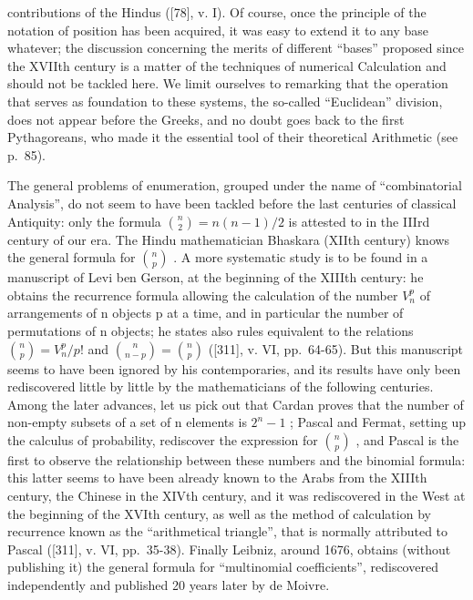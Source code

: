 contributions of the Hindus ({[}78{]}, v. I). Of course, once the principle of the notation of position has been acquired, it was easy to extend it to any base whatever; the discussion concerning the merits of different ``bases'' proposed since the XVIIth century is a matter of the techniques of numerical Calculation and should not be tackled here. We limit ourselves to remarking that the operation that serves as foundation to these systems, the so-called ``Euclidean'' division, does not appear before the Greeks, and no doubt goes back to the first Pythagoreans, who made it the essential tool of their theoretical Arithmetic (see p.~85).

The general problems of enumeration, grouped under the name of ``combinatorial Analysis'', do not seem to have been tackled before the last centuries of classical Antiquity: only the formula \(\binom{n}{2}=n(n-1)/2\) is attested to in the IIIrd century of our era. The Hindu mathematician Bhaskara (XIIth century) knows the general formula for \(\binom{n}{p}\) . A more systematic study is to be found in a manuscript of Levi ben Gerson, at the beginning of the XIIIth century: he obtains the recurrence formula allowing the calculation of the number \(V_{n}^{p}\) of arrangements of n objects p at a time, and in particular the number of permutations of n objects; he states also rules equivalent to the relations \(\binom{n}{p}=V_{n}^{p}/p!\) and \(\binom{n}{n-p}=\binom{n}{p}\) ({[}311{]}, v. VI, pp.~64-65). But this manuscript seems to have been ignored by his contemporaries, and its results have only been rediscovered little by little by the mathematicians of the following centuries. Among the later advances, let us pick out that Cardan proves that the number of non-empty subsets of a set of n elements is \(2^{n}-1\) ; Pascal and Fermat, setting up the calculus of probability, rediscover the expression for \(\binom{n}{p}\) , and Pascal is the first to observe the relationship between these numbers and the binomial formula: this latter seems to have been already known to the Arabs from the XIIIth century, the Chinese in the XIVth century, and it was rediscovered in the West at the beginning of the XVIth century, as well as the method of calculation by recurrence known as the ``arithmetical triangle'', that is normally attributed to Pascal ({[}311{]}, v. VI, pp.~35-38). Finally Leibniz, around 1676, obtains (without publishing it) the general formula for ``multinomial coefficients'', rediscovered independently and published 20 years later by de Moivre.

